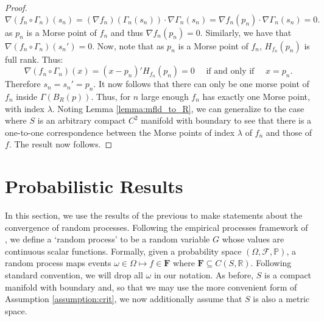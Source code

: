 \documentclass[11pt]{article}
\newcommand{\1}{\mathbf{1}}
\theoremstyle{definition}
\theoremstyle{remark}
\begin{document}
\begin{proof}
\begin{equation}\nonumber
    \nabla(f_n \circ \Gamma_n)(s_n) = (\nabla f_n)(\Gamma_n(s_n)) \cdot \nabla \Gamma_n (s_n)  = \nabla f_n(p_n) \cdot \nabla \Gamma_n (s_n) = 0.
\end{equation}
as $p_n$ is a Morse point of $f_n$ and thus $\nabla f_n(p_n)=0$. Similarly, we have that $\nabla(f_n \circ \Gamma_n)(s_n')=0$. Now, note that as $p_n$ is a Morse point of $f_n$, $H_{f_n}(p_n)$ is full rank. Thus:
\begin{equation}\nonumber
    \nabla(f_n \circ \Gamma_n)(x)=(x-p_n)'H_{f_n}(p_n)=0\quad \text{ if and only if }\quad x=p_n.
\end{equation}
Therefore $s_n=s_n'=p_n$. It now follows that there can only be one morse point of $f_n$ inside $\Gamma(B_{R}(p))$. Thus, for $n$ large enough $f_n$ has exactly one Morse point, with index $\lambda$. Noting Lemma \ref{lemma:mfld_to_R}, we can generalize to the case where $S$ is an arbitrary compact $C^2$ manifold with boundary to see that there is a one-to-one correspondence between the Morse points of index $\lambda$ of $f_n$ and those of $f$. The result now follows.
\end{proof}

\section{Probabilistic Results}\label{sec:prob}

In this section, we use the results of the previous to make statements about the convergence of random processes. Following the empirical processes framework of \cite{van1996weak}, we define a `random process' to be a random variable $G$ whose values are continuous scalar functions. Formally, given a probability space $(\Omega, \mathcal{F}, \mathbb{P})$, a random process maps events $\omega \in \Omega \mapsto f \in \mathbf{F}$ where $\mathbf{F}\subseteq C(S,\mathbb{R})$. Following standard convention, we will drop all $\omega$ in our notation. As before, $S$ is a compact manifold with boundary and, so that we may use the more convenient form of Assumption \ref{assumption:crit}, we now additionally assume that $S$ is also a metric space.
\end{document}
